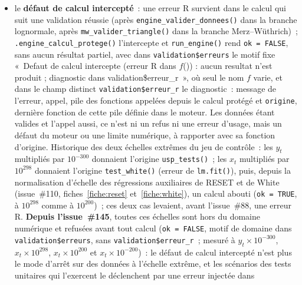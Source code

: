 \documentclass[a4paper,11pt]{article}
\newcommand{\code}[1]{\texttt{\small #1}}
\begin{document}
\begin{itemize}[itemsep=2pt]
  \code{alpha = 0.3} reste cité \code{0.3}). Relèvent du même régime, en appel
  direct, la durée non entière refusée par \code{usp\_credibilite()}, l'annexe refusée par
  \code{.annexe\_verifiee()} et le segment refusé par \code{.segment\_verifie()}, qu'appellent
  \code{usp\_segment\_infos()} et, par elle, \code{usp\_parametre\_standard()}, ainsi
  qu'\code{usp\_bareme\_segment()} depuis l'issue~\#133, ou inconnu de l'annexe
  (\code{.segment\_ligne()})~; \code{theta\_equiv} n'en relève pas~: hors domaine, c'est un
  refus de données~;
\item le \textbf{défaut de calcul intercepté}~: une erreur R survient dans le calcul qui suit une
  validation réussie (après \code{engine\_valider\_donnees()} dans la branche lognormale, après
  \code{mw\_valider\_triangle()} dans la branche Merz--Wüthrich)~; \code{.engine\_calcul\_protege()}
  l'intercepte et \code{run\_engine()} rend \code{ok = FALSE}, sans aucun résultat partiel, avec
  dans \code{validation\$erreurs} le motif fixe «~Defaut de calcul intercepte (erreur R dans
  $f$()) : aucun resultat n'est produit ; diagnostic dans validation\$erreur\_r~», où seul le nom
  $f$ varie, et dans le champ distinct \code{validation\$erreur\_r} le diagnostic~: message de
  l'erreur, appel, pile des fonctions appelées depuis le calcul protégé et \code{origine},
  dernière fonction de cette pile définie dans le moteur. Les données étant valides et l'appel
  aussi, ce n'est ni un refus ni une erreur d'usage, mais un défaut du moteur ou une limite
  numérique, à rapporter avec sa fonction d'origine. Historique des deux échelles extrêmes du
  jeu de contrôle~: les $y_t$ multipliés par $10^{-300}$ donnaient l'origine \code{usp\_tests()}~;
  les $x_t$ multipliés par $10^{298}$ donnaient l'origine \code{test\_white()} (erreur de
  \code{lm.fit()}), puis, depuis la normalisation d'échelle des régressions auxiliaires de RESET
  et de White (issue~\#110, fiches~\ref{fiche:reset} et~\ref{fiche:white}), un calcul abouti
  (\code{ok = TRUE}, à $10^{298}$ comme à $10^{200}$)~; ces deux cas levaient, avant
  l'issue~\#88, une erreur R. \textbf{Depuis l'issue~\#145}, toutes ces échelles sont hors du
  domaine numérique et refusées avant tout calcul (\code{ok = FALSE}, motif de domaine dans
  \code{validation\$erreurs}, sans \code{validation\$erreur\_r}~; mesuré à $y_t \times 10^{-300}$,
  $x_t \times 10^{298}$, $x_t \times 10^{200}$ et $x_t \times 10^{-200}$)~: le défaut de calcul
  intercepté n'est plus le mode d'arrêt sur des données à l'échelle extrême, et les scénarios
  des tests unitaires qui l'exercent le déclenchent par une erreur injectée dans

\end{itemize}
\end{document}
